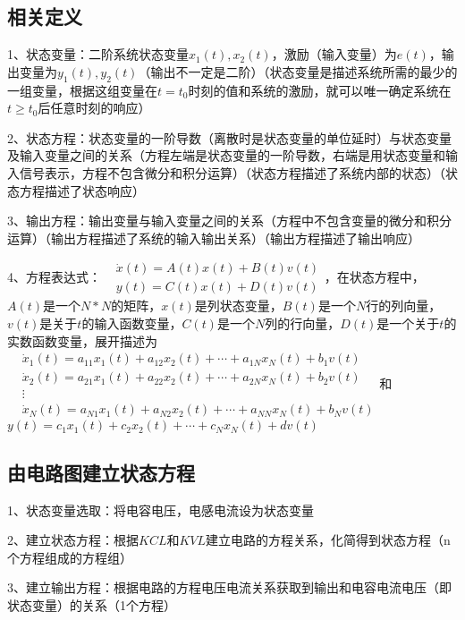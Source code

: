 \subsection{相关定义}

1、状态变量：二阶系统状态变量$x_1(t),x_2(t)$，激励（输入变量）为$e(t)$，输出变量为$y_1(t),y_2(t)$（输出不一定是二阶）（状态变量是描述系统所需的最少的一组变量，根据这组变量在$t=t_0$时刻的值和系统的激励，就可以唯一确定系统在$t≥t_0$后任意时刻的响应）

2、状态方程：状态变量的一阶导数（离散时是状态变量的单位延时）与状态变量及输入变量之间的关系（方程左端是状态变量的一阶导数，右端是用状态变量和输入信号表示，方程不包含微分和积分运算）（状态方程描述了系统内部的状态）（状态方程描述了状态响应）

3、输出方程：输出变量与输入变量之间的关系（方程中不包含变量的微分和积分运算）（输出方程描述了系统的输入输出关系）（输出方程描述了输出响应）

4、方程表达式：$\begin{aligned}&\dot{x}(t)=A(t) x(t)+B(t) v(t) \\&y(t)=C(t) x(t)+D(t) v(t)\end{aligned}$，在状态方程中，$A(t)$是一个$N*N$的矩阵，$x(t)$是列状态变量，$B(t)$是一个$N$行的列向量，$v(t)$是关于$t$的输入函数变量，$C(t)$是一个$N$列的行向量，$D(t)$是一个关于$t$的实数函数变量，展开描述为$\begin{aligned}&\dot{x}_{1}(t)=a_{11} x_{1}(t)+a_{12} x_{2}(t)+\cdots+a_{1 N} x_{N}(t)+b_{1} v(t) \\&\dot{x}_{2}(t)=a_{21} x_{1}(t)+a_{22} x_{2}(t)+\cdots+a_{2 N} x_{N}(t)+b_{2} v(t) \\&\vdots \\&\dot{x}_{N}(t)=a_{N 1} x_{1}(t)+a_{N 2} x_{2}(t)+\cdots+a_{N N} x_{N}(t)+b_{N} v(t)\end{aligned}$和$y(t)=c_{1} x_{1}(t)+c_{2} x_{2}(t)+\cdots+c_{N} x_{N}(t)+d v(t)$



\subsection{由电路图建立状态方程}

1、状态变量选取：将电容电压，电感电流设为状态变量

2、建立状态方程：根据$KCL$和$KVL$建立电路的方程关系，化简得到状态方程（n个方程组成的方程组）

3、建立输出方程：根据电路的方程电压电流关系获取到输出和电容电流电压（即状态变量）的关系（1个方程）



